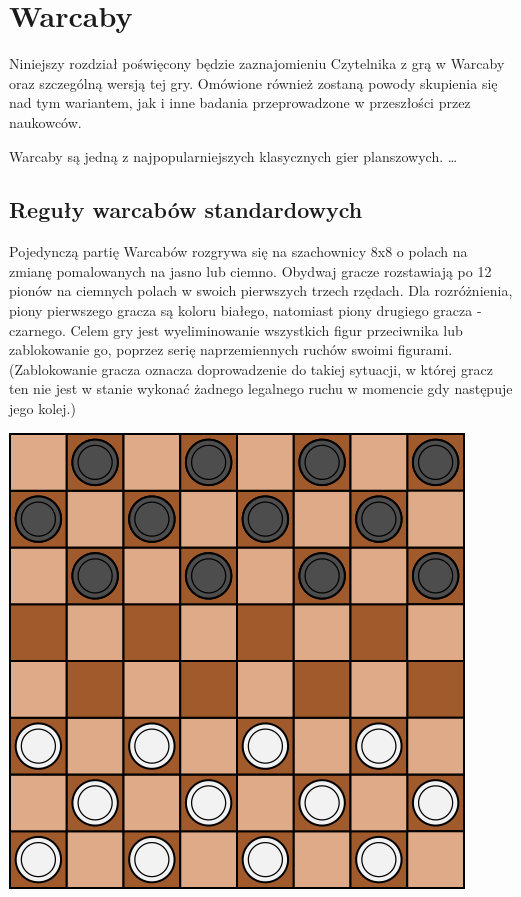 \chapter{Warcaby}
\thispagestyle{chapterBeginStyle}
\label{rozdzial1}

{\color{dgray}
Niniejszy rozdział poświęcony będzie zaznajomieniu Czytelnika z grą w Warcaby oraz szczególną wersją tej gry. Omówione również zostaną powody skupienia się nad tym wariantem, jak i inne badania przeprowadzone w przeszłości przez naukowców.
}

Warcaby są jedną z najpopularniejszych klasycznych gier planszowych. \ldots

\section{Reguły warcabów standardowych}

Pojedynczą partię Warcabów rozgrywa się na szachownicy 8x8 o polach na zmianę pomalowanych na jasno lub ciemno. Obydwaj gracze rozstawiają po 12 pionów na ciemnych polach w swoich pierwszych trzech rzędach. Dla rozróżnienia, piony pierwszego gracza są koloru białego, natomiast piony drugiego gracza - czarnego. Celem gry jest wyeliminowanie wszystkich figur przeciwnika lub zablokowanie go, poprzez serię naprzemiennych ruchów swoimi figurami. (Zablokowanie gracza oznacza doprowadzenie do takiej sytuacji, w której gracz ten nie jest w stanie wykonać żadnego legalnego ruchu w momencie gdy następuje jego kolej.)

\includegraphics[scale=.6]{graphics/warcaby_planszaStartowa.png}

